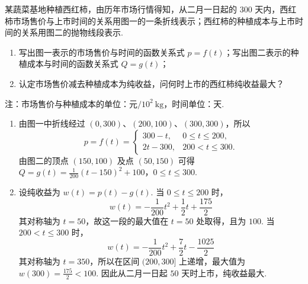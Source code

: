 \begin{problem}
某蔬菜基地种植西红柿，由历年市场行情得知，从二月一日起的 \(300\) 天内，西红柿市场售价与上市时间的关系用图一的一条折线表示；西红柿的种植成本与上市时间的关系用图二的抛物线段表示.

\begin{enumerate}
\item 写出图一表示的市场售价与时间的函数关系式 \(p=f(t)\)；写出图二表示的种植成本与时间的函数关系式 \(Q=g(t)\)；
\item 认定市场售价减去种植成本为纯收益，问何时上市的西红柿纯收益最大？
\end{enumerate}

注：市场售价与种植成本的单位：\(\text{元}/10^{2}\mathrm{~kg}\)，时间单位：\(\text{天}\).

\begingroup
\leftskip=0pt\relax
\everypar{}
\endgroup

\begin{solution}
\begin{enumerate}
\item 由图一中折线经过 \((0,300)\)、\((200,100)\)、\((300,300)\)，所以
\[
p=f(t)=\begin{cases}
300-t, & 0\leqslant t\leqslant200,\\
2t-300, & 200<t\leqslant300.
\end{cases}
\]
由图二的顶点 \((150,100)\) 及点 \((50,150)\) 可得
\(Q=g(t)=\frac1{200}(t-150)^2+100\)，\(0\leqslant t\leqslant300\).
\item 设纯收益为 \(w(t)=p(t)-g(t)\). 当 \(0\leqslant t\leqslant200\) 时，
\[
w(t)=-\frac1{200}t^2+\frac12t+\frac{175}{2}
\]
其对称轴为 \(t=50\)，故这一段的最大值在 \(t=50\) 处取得，且为 \(100\). 当 \(200<t\leqslant300\) 时，
\[
w(t)=-\frac1{200}t^2+\frac72t-\frac{1025}{2}
\]
其对称轴为 \(t=350\)，所以在区间 \((200,300]\) 上递增，最大值为 \(w(300)=\frac{175}{2}<100\). 因此从二月一日起 \(50\) 天时上市，纯收益最大.
\end{enumerate}
\end{solution}
\end{problem}

